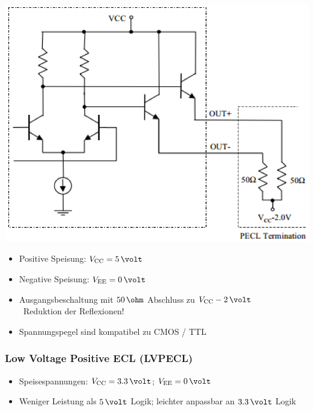 \begin{minipage}[c]{0.25\columnwidth}
    \includegraphics[width=\columnwidth]{images/PECL.png}
\end{minipage}
\hfill
\begin{minipage}[c]{0.72\columnwidth}
   \begin{itemize}
    \item Positive Speisung: $V_{\rm CC} = 5 \, \volt$
    \item Negative Speisung: $V_{\rm EE} = 0 \, \volt$
    \item Ausgangsbeschaltung mit $50 \, \ohm$ Abschluss zu $V_{\rm CC} - 2 \, \volt$ \\
        \textrightarrow\ Reduktion der Reflexionen!
    \item Spannungspegel sind kompatibel zu CMOS / TTL
   \end{itemize}
\end{minipage}

\subsubsection{Low Voltage Positive ECL (LVPECL)}

\begin{itemize}
    \item Speisespannungen:  $V_{\rm CC} = 3.3 \, \volt$; $V_{\rm EE} = 0 \, \volt$
    \item Weniger Leistung als $5 \, \volt$ Logik; leichter anpassbar an $3.3 \, \volt$ Logik
\end{itemize}


